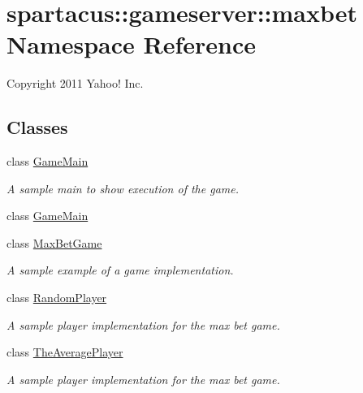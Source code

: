 \hypertarget{namespacespartacus_1_1gameserver_1_1maxbet}{
\section{\-s\-p\-a\-r\-t\-a\-c\-u\-s\-:\-:\-g\-a\-m\-e\-s\-e\-r\-v\-e\-r\-:\-:\-m\-a\-x\-b\-e\-t \-N\-a\-m\-e\-s\-p\-a\-c\-e \-R\-e\-f\-e\-r\-e\-n\-c\-e}
\label{namespacespartacus_1_1gameserver_1_1maxbet}
}


Copyright 2011 Yahoo! Inc.  


\subsection*{Classes}
\begin{DoxyCompactItemize}
\item 
class \hyperlink{classspartacus_1_1gameserver_1_1maxbet_1_1GameMain}{\-G\-a\-m\-e\-M\-a\-i\-n}
\begin{DoxyCompactList}\small\item\em A sample main to show execution of the game. \end{DoxyCompactList}\item 
class \hyperlink{classspartacus_1_1gameserver_1_1maxbet_1_1GameMain2}{\-G\-a\-m\-e\-M\-a\-i\-n}
\item 
class \hyperlink{classspartacus_1_1gameserver_1_1maxbet_1_1MaxBetGame}{\-M\-a\-x\-B\-e\-t\-G\-a\-m\-e}
\begin{DoxyCompactList}\small\item\em A sample example of a game implementation. \end{DoxyCompactList}\item 
class \hyperlink{classspartacus_1_1gameserver_1_1maxbet_1_1RandomPlayer}{\-R\-a\-n\-d\-o\-m\-P\-l\-a\-y\-e\-r}
\begin{DoxyCompactList}\small\item\em A sample player implementation for the max bet game. \end{DoxyCompactList}\item 
class \hyperlink{classspartacus_1_1gameserver_1_1maxbet_1_1TheAveragePlayer}{\-T\-h\-e\-A\-v\-e\-r\-a\-g\-e\-P\-l\-a\-y\-e\-r}
\begin{DoxyCompactList}\small\item\em A sample player implementation for the max bet game. \end{DoxyCompactList}\end{DoxyCompactItemize}


